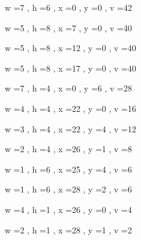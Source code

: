 \documentclass[11pt]{article}
\begin{document}
w =7 , h =6 , x =0 , y =0 , v =42
\par
w =5 , h =8 , x =7 , y =0 , v =40
\par
w =5 , h =8 , x =12 , y =0 , v =40
\par
w =5 , h =8 , x =17 , y =0 , v =40
\par
w =7 , h =4 , x =0 , y =6 , v =28
\par
w =4 , h =4 , x =22 , y =0 , v =16
\par
w =3 , h =4 , x =22 , y =4 , v =12
\par
w =2 , h =4 , x =26 , y =1 , v =8
\par
w =1 , h =6 , x =25 , y =4 , v =6
\par
w =1 , h =6 , x =28 , y =2 , v =6
\par
w =4 , h =1 , x =26 , y =0 , v =4
\par
w =2 , h =1 , x =28 , y =1 , v =2
\par
\newpage
\end{document}
